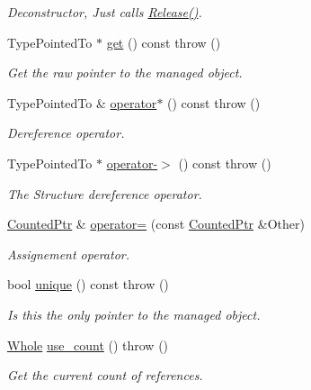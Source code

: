\begin{DoxyCompactItemize}
\begin{DoxyCompactList}\small\item\em Deconstructor, Just calls \hyperlink{classMezzanine_1_1CountedPtr_aedb1e5da381fcbf10c7737d4383fb715}{Release()}. \item\end{DoxyCompactList}\item 
TypePointedTo $\ast$ \hyperlink{classMezzanine_1_1CountedPtr_a6f00c38226d1ae4f7797fe5944a53333}{get} () const   throw ()
\begin{DoxyCompactList}\small\item\em Get the raw pointer to the managed object. \item\end{DoxyCompactList}\item 
TypePointedTo \& \hyperlink{classMezzanine_1_1CountedPtr_a9fbe491e40d8adbaa372890501dcc5b1}{operator$\ast$} () const   throw ()
\begin{DoxyCompactList}\small\item\em Dereference operator. \item\end{DoxyCompactList}\item 
TypePointedTo $\ast$ \hyperlink{classMezzanine_1_1CountedPtr_a88d0f8a1a22daa3a06394aa1430a6299}{operator-\/$>$} () const   throw ()
\begin{DoxyCompactList}\small\item\em The Structure dereference operator. \item\end{DoxyCompactList}\item 
\hyperlink{classMezzanine_1_1CountedPtr}{CountedPtr} \& \hyperlink{classMezzanine_1_1CountedPtr_afccd80ffc3d1e940b26dbbec0653e0f9}{operator=} (const \hyperlink{classMezzanine_1_1CountedPtr}{CountedPtr} \&Other)
\begin{DoxyCompactList}\small\item\em Assignement operator. \item\end{DoxyCompactList}\item 
bool \hyperlink{classMezzanine_1_1CountedPtr_ae991b2beca4077dc40c53110bc97308c}{unique} () const   throw ()
\begin{DoxyCompactList}\small\item\em Is this the only pointer to the managed object. \item\end{DoxyCompactList}\item 
\hyperlink{namespaceMezzanine_adcbb6ce6d1eb4379d109e51171e2e493}{Whole} \hyperlink{classMezzanine_1_1CountedPtr_a5c97a5c62736f9304fca9ec38df71ed2}{use\_\-count} ()  throw ()
\begin{DoxyCompactList}\small\item\em Get the current count of references. \item\end{DoxyCompactList}\end{DoxyCompactItemize}
